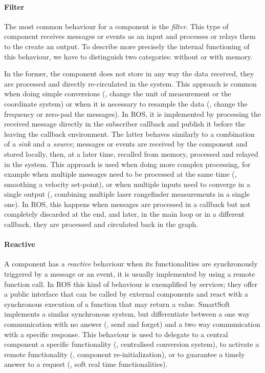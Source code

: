 \paragraph{Filter} The most common behaviour for a component is the \textit{filter}. This type of component receives messages or events as an input and processes or relays them to the create an output. To describe more precisely the internal functioning of this behaviour, we have to distinguish two categories: without or with memory. 

In the former, the component does not store in any way the data received, they are processed and directly re-circulated in the system. This approach is common when doing simple conversions (\eg, change the unit of measurement or the coordinate system) or when it is necessary to resample the data (\eg, change the frequency or zero-pad the messages). In ROS, it is implemented by processing the received message directly in the subscriber callback and publish it before the leaving the callback environment. The latter behaves similarly to a combination of a \textit{sink} and a \textit{source}; messages or events are received by the component and stored locally, then, at a later time, recalled from memory, processed and relayed in the system. This approach is used when doing more complex processing, for example when multiple messages need to be processed at the same time (\eg, smoothing a velocity set-point), or when multiple inputs need to converge in a single output (\eg, combining multiple laser rangefinder measurements in a single one). In ROS, this happens when messages are processed in a callback but not completely discarded at the end, and later, in the main loop or in a different callback, they are processed and circulated back in the graph.

\paragraph{Reactive} A component has a \textit{reactive} behaviour when its functionalities are synchronously triggered by a message or an event, it is usually implemented by using a remote function call. In ROS this kind of behaviour is exemplified by services; they offer a public interface that can be called by external components and react with a synchronous execution of a function that may return a value.  SmartSoft implements a similar synchronous system, but differentiate between a one way communication with no answer (\ie, send and forget) and a two way communication with a specific response. This behaviour is used to delegate to a central component a specific functionality (\eg, centralised conversion system), to activate a remote functionality (\eg, component \mbox{re-initialization}), or to guarantee a timely answer to a request (\eg, soft real time functionalities).

